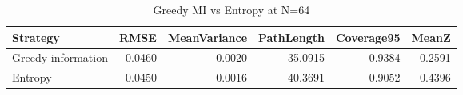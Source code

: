\begin{table}
\caption{Greedy MI vs Entropy at N=64}
\label{tab:smart_comparison}
\begin{tabular}{lrrrrr}
\toprule
Strategy & RMSE & MeanVariance & PathLength & Coverage95 & MeanZ \\
\midrule
Greedy information & 0.0460 & 0.0020 & 35.0915 & 0.9384 & 0.2591 \\
Entropy & 0.0450 & 0.0016 & 40.3691 & 0.9052 & 0.4396 \\
\bottomrule
\end{tabular}
\end{table}
